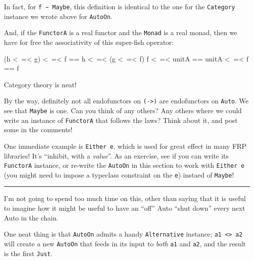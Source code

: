 \documentclass[]{article}
\newenvironment{Shaded}{}{}
\newcommand{\FunctionTok}[1]{\textcolor[rgb]{0.02,0.16,0.49}{#1}}
\newcommand{\NormalTok}[1]{#1}
\begin{document}
In fact, for \texttt{f\ \textasciitilde{}\ Maybe}, this definition is identical
to the one for the \texttt{Category} instance we wrote above for
\texttt{AutoOn}.

And, if the \texttt{FunctorA} is a real functor and the \texttt{Monad} is a real
monad, then we have for free the associativity of this super-fish operator:

\begin{Shaded}
\begin{Highlighting}[]
\NormalTok{(h }\FunctionTok{<~=<}\NormalTok{ g) }\FunctionTok{<~=<}\NormalTok{ f }\FunctionTok{==}\NormalTok{ h }\FunctionTok{<~=<}\NormalTok{ (g }\FunctionTok{<~=<}\NormalTok{ f)}
\NormalTok{f }\FunctionTok{<~=<}\NormalTok{ unitA      }\FunctionTok{==}\NormalTok{ unitA }\FunctionTok{<~=<}\NormalTok{ f      }\FunctionTok{==}\NormalTok{ f}
\end{Highlighting}
\end{Shaded}

Category theory is neat!

By the way, definitely not all endofunctors on \texttt{(-\textgreater{})} are
endofunctors on \texttt{Auto}. We see that \texttt{Maybe} is one. Can you think
of any others? Any others where we could write an instance of \texttt{FunctorA}
that follows the laws? Think about it, and post some in the comments!

One immediate example is \texttt{Either\ e}, which is used for great effect in
many FRP libraries! It's ``inhibit, with a \emph{value}''. As an exercise, see
if you can write its \texttt{FunctorA} instance, or re-write the \texttt{AutoOn}
in this section to work with \texttt{Either\ e} (you might need to impose a
typeclass constraint on the \texttt{e}) instaed of \texttt{Maybe}!

\begin{center}\rule{0.5\linewidth}{\linethickness}\end{center}

I'm not going to spend too much time on this, other than saying that it is
useful to imagine how it might be useful to have an ``off'' Auto ``shut down''
every next Auto in the chain.

One neat thing is that \texttt{AutoOn} admits a handy \texttt{Alternative}
instance; \texttt{a1\ \textless{}\textbar{}\textgreater{}\ a2} will create a new
\texttt{AutoOn} that feeds in its input to \emph{both} \texttt{a1} and
\texttt{a2}, and the result is the first \texttt{Just}.
\end{document}
